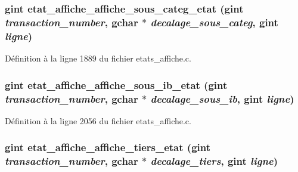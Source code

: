 \subsubsection[{etat\_\-affiche\_\-affiche\_\-sous\_\-categ\_\-etat}]{\setlength{\rightskip}{0pt plus 5cm}gint etat\_\-affiche\_\-affiche\_\-sous\_\-categ\_\-etat (gint {\em transaction\_\-number}, \/  gchar $\ast$ {\em decalage\_\-sous\_\-categ}, \/  gint {\em ligne})}\label{etats__affiche_8h_a20f3e545893f2398023f87c885d9644a}


Définition à la ligne 1889 du fichier etats\_\-affiche.c.

\subsubsection[{etat\_\-affiche\_\-affiche\_\-sous\_\-ib\_\-etat}]{\setlength{\rightskip}{0pt plus 5cm}gint etat\_\-affiche\_\-affiche\_\-sous\_\-ib\_\-etat (gint {\em transaction\_\-number}, \/  gchar $\ast$ {\em decalage\_\-sous\_\-ib}, \/  gint {\em ligne})}\label{etats__affiche_8h_a24b3cc976699bf78cb8e28e5e85d9544}


Définition à la ligne 2056 du fichier etats\_\-affiche.c.

\subsubsection[{etat\_\-affiche\_\-affiche\_\-tiers\_\-etat}]{\setlength{\rightskip}{0pt plus 5cm}gint etat\_\-affiche\_\-affiche\_\-tiers\_\-etat (gint {\em transaction\_\-number}, \/  gchar $\ast$ {\em decalage\_\-tiers}, \/  gint {\em ligne})}\label{etats__affiche_8h_aac3474fdf470273303bec55a54b25ca5}


